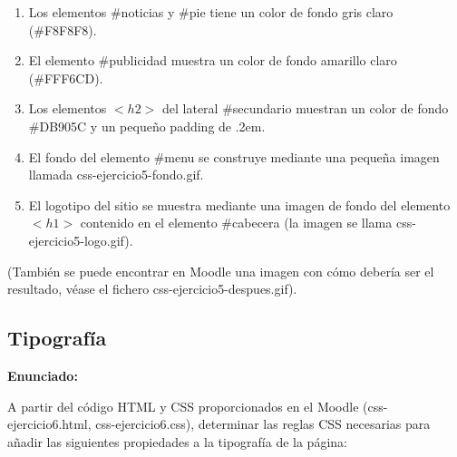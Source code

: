 \begin{enumerate}
  \item Los elementos \#noticias y \#pie tiene un color de fondo gris claro (\#F8F8F8).
  \item El elemento \#publicidad muestra un color de fondo amarillo claro (\#FFF6CD).
  \item Los elementos $<h2>$ del lateral \#secundario muestran un color de fondo \#DB905C y un pequeño padding de .2em.
  \item El fondo del elemento \#menu se construye mediante una pequeña imagen llamada css-ejercicio5-fondo.gif.
  \item El logotipo del sitio se muestra mediante una imagen de fondo del elemento $<h1>$ contenido en el elemento \#cabecera (la imagen se llama css-ejercicio5-logo.gif).
\end{enumerate}

(También se puede encontrar en Moodle una imagen con cómo debería ser el resultado, 
véase el fichero css-ejercicio5-despues.gif).

\subsection{Tipografía}
\label{subsec:tipografia}

\textbf{Enunciado:}

A partir del código HTML y CSS proporcionados en el Moodle (css-ejercicio6.html, css-ejercicio6.css), determinar las reglas CSS necesarias para añadir las siguientes propiedades a la tipografía de la página:

